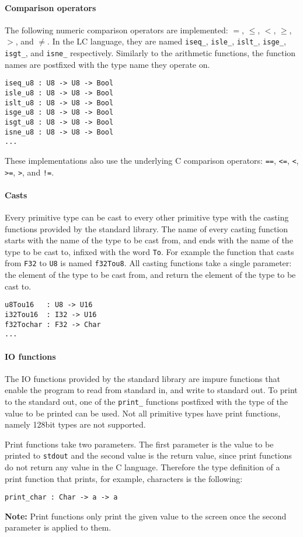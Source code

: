\documentclass[12pt]{article}
\begin{document}
\paragraph{Comparison operators} The following numeric comparison operators are
implemented: $=$, $\le$, $<$, $\ge$, $>$, and $\ne$. In the LC language, they
are named \verb$iseq_$, \verb$isle_$, \verb$islt_$, \verb$isge_$, \verb$isgt_$,
and \verb$isne_$ respectively. Similarly to the arithmetic functions, the
function names are postfixed with the type name they operate on.
\begin{lstlisting}
iseq_u8 : U8 -> U8 -> Bool
isle_u8 : U8 -> U8 -> Bool
islt_u8 : U8 -> U8 -> Bool
isge_u8 : U8 -> U8 -> Bool
isgt_u8 : U8 -> U8 -> Bool
isne_u8 : U8 -> U8 -> Bool
...
\end{lstlisting}
These implementations also use the underlying C comparison operators: \verb$==$,
\verb$<=$, \verb$<$, \verb$>=$, \verb$>$, and \verb$!=$.

\paragraph{Casts} Every primitive type can be cast to every other primitive type
with the casting functions provided by the standard library. The name of every
casting function starts with the name of the type to be cast from, and ends with
the name of the type to be cast to, infixed with the word \verb$To$. For example
the function that casts from \verb$F32$ to \verb$U8$ is named \verb$f32Tou8$.
All casting functions take a single parameter: the element of the type to be
cast from, and return the element of the type to be cast to.
\begin{lstlisting}
u8Tou16   : U8 -> U16
i32Tou16  : I32 -> U16
f32Tochar : F32 -> Char
...
\end{lstlisting}

\paragraph{IO functions} The IO functions provided by the standard library are
impure functions that enable the program to read from standard in, and write to
standard out. To print to the standard out, one of the \verb$print_$ functions
postfixed with the type of the value to be printed can be used. Not all
primitive types have print functions, namely 128bit types are not supported.

Print functions take two parameters. The first parameter is the value to be
printed to \verb$stdout$ and the second value is the return value, since print
functions do not return any value in the C language. Therefore the type
definition of a print function that prints, for example, characters is the
following:
\begin{lstlisting}
print_char : Char -> a -> a 
\end{lstlisting}
\textbf{Note:} Print functions only print the given value to the screen once the
second parameter is applied to them.
\end{document}
